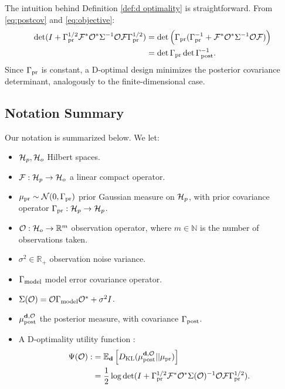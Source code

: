 \noindent The intuition behind Definition \ref{def:d optimality} is
straightforward. From \eqref{eq:postcov} and \eqref{eq:objective}:
\begin{align*}
  \begin{split}
    \det ( I + \prcov^{1/2}  \fwd ^* \obs^* \Sigma^{-1} \obs \fwd \prcov^{1/2}) &= \det \Big( \prcov ( \prcov^{-1} + \fwd ^* \obs^* \Sigma^{-1} \obs \fwd) \Big )\\
    &= \det \prcov \det \postcov^{-1}.
  \end{split}
\end{align*}
Since $\Gamma_{\textup{pr}}$ is constant, a D-optimal design minimizes the posterior
covariance determinant, analogously to the finite-dimensional case.


\subsection{Notation Summary}\label{subsec:notation}
  Our notation is summarized below. We let:
  \begin{itemize}
  \item $\mathcal{H}_p, \mathcal{H}_o$ Hilbert spaces.
  \item $\mathcal{F}:\mathcal{H}_p \to \mathcal{H}_o$ a linear compact operator.
  \item $\mu_{\textup{pr}} \sim \mathcal{N}(0, \Gamma_{\textup{pr}})$ prior Gaussian measure on
    $\mathcal{H}_p$, with prior covariance operator $\Gamma_{\textup{pr}}:\mathcal{H}_p \to \mathcal{H}_p$.
  \item $\mathcal{O}: \mathcal{H}_o \to \mathbb{R}^m$ observation operator, where $m
    \in \mathbb{N}$ is the number of observations taken. 
  \item $\sigma^2 \in \mathbb{R}_{+}$ observation noise variance.
  \item $\Gamma_{\textup{model}}$ model error covariance operator.
  \item $\Sigma(\mathcal{O}) = \mathcal{O} \Gamma_{\textup{model}} \mathcal{O}^* + \sigma^2I$. 
  \item $\mu_{\textup{post}}^{\mathbf{d}, \mathcal{O}}$ the posterior measure, with covariance $\Gamma_{\textup{post}}$.
  \item A D-optimality utility function
    \cite{AlexanderianGloorGhattas14}:
    \begin{align*}
      \begin{split}
        \tar(\obs) :&= \mathbb{E}_{\data}\left [ D_{\text{KL}} (\post || \pr ) \right ] \\
        &= \frac12 \log \det ( I + \prcov^{1/2} \fwd ^* \obs^* \Sigma(\obs)^{-1} \obs
        \fwd \prcov^{1/2}).
      \end{split}
    \end{align*}
  \end{itemize}


